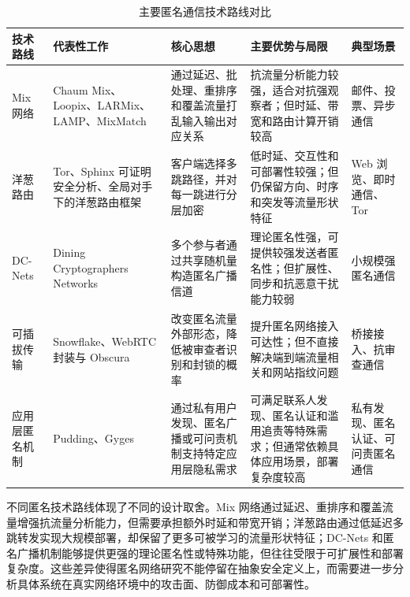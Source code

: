 \begin{table}[htbp]
\centering
\scriptsize
\caption{主要匿名通信技术路线对比}
\label{tab:anonymous_tech_comparison}
\renewcommand{\arraystretch}{1.25}
\begin{tabular}{@{}p{}p{}p{}p{}p{}@{}}
\hline
\textbf{技术路线} & \textbf{代表性工作} & \textbf{核心思想} & \textbf{主要优势与局限} & \textbf{典型场景} \\
\hline
Mix 网络 & Chaum Mix、Loopix、LARMix、LAMP、MixMatch\cite{chaum1981untraceable,piotrowska2017loopix,rahimi2024larmix,rahimi2025lamp,oldenburg2024mixmatch} & 通过延迟、批处理、重排序和覆盖流量打乱输入输出对应关系 & 抗流量分析能力较强，适合对抗强观察者；但时延、带宽和路由计算开销较高 & 邮件、投票、异步通信 \\
\hline
洋葱路由 & Tor、Sphinx 可证明安全分析、全局对手下的洋葱路由框架\cite{dingledine2004tor,scherer2023provable,scherer2024framework} & 客户端选择多跳路径，并对每一跳进行分层加密 & 低时延、交互性和可部署性较强；但仍保留方向、时序和突发等流量形状特征 & Web 浏览、即时通信、Tor \\
\hline
DC-Nets & Dining Cryptographers Networks\cite{chaum1988dining} & 多个参与者通过共享随机量构造匿名广播信道 & 理论匿名性强，可提供较强发送者匿名性；但扩展性、同步和抗恶意干扰能力较弱 & 小规模强匿名通信 \\
\hline
可插拔传输 & Snowflake、WebRTC 封装与 Obscura\cite{macmillan2020evaluating,vilalonga2026obscura} & 改变匿名流量外部形态，降低被审查者识别和封锁的概率 & 提升匿名网络接入可达性；但不直接解决端到端流量相关和网站指纹问题 & 桥接接入、抗审查通信 \\
\hline
应用层匿名机制 & Pudding、Gyges\cite{kocaougullar2024pudding,dong2025ring} & 通过私有用户发现、匿名广播或可问责机制支持特定应用层隐私需求 & 可满足联系人发现、匿名认证和滥用追责等特殊需求；但通常依赖具体应用场景，部署复杂度较高 & 私有发现、匿名认证、可问责匿名通信 \\
\hline
\end{tabular}
\end{table}

不同匿名技术路线体现了不同的设计取舍。Mix 网络通过延迟、重排序和覆盖流量增强抗流量分析能力，但需要承担额外时延和带宽开销；洋葱路由通过低延迟多跳转发实现大规模部署，却保留了更多可被学习的流量形状特征；DC-Nets 和匿名广播机制能够提供更强的理论匿名性或特殊功能，但往往受限于可扩展性和部署复杂度。这些差异使得匿名网络研究不能停留在抽象安全定义上，而需要进一步分析具体系统在真实网络环境中的攻击面、防御成本和可部署性。

